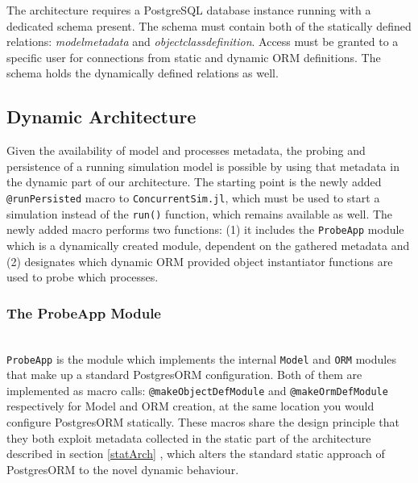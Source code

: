 \documentclass{juliacon}
\begin{document}
The architecture requires a PostgreSQL database instance running with a dedicated schema present. The schema must contain both of the statically defined relations: \textit{modelmetadata} and \textit{objectclassdefinition}. Access must be granted to a specific user for connections from static and dynamic ORM definitions. The schema holds the dynamically defined relations as well. \vskip 6pt

\subsection{Dynamic Architecture}

Given the availability of model and processes metadata, the probing and persistence of a running simulation model is possible by using that metadata in the dynamic part of our architecture. The starting point is the newly added \texttt{@runPersisted} macro to \texttt{ConcurrentSim.jl}, which must be used to start a simulation  instead of the \texttt{run()} function, which remains available as well. The newly added macro performs two functions: (1) it includes the \texttt{ProbeApp} module which is a dynamically created module, dependent on the gathered metadata and (2) designates which dynamic ORM provided object instantiator functions are used to probe which processes. \vskip 6pt

\subsubsection{The ProbeApp Module}\hfill\\

\texttt{ProbeApp} is the module which implements the internal \texttt{Model} and \texttt{ORM} modules that make up a standard PostgresORM configuration. Both of them are implemented as macro calls: \texttt{@makeObjectDefModule} and \texttt{@makeOrmDefModule} respectively for Model and ORM creation, at the same location you would configure PostgresORM statically. These macros share the design principle that they both exploit metadata collected in the static part of the architecture described in section \ref{statArch} , which alters the standard static approach of PostgresORM to the novel dynamic behaviour.\vskip 6pt

\end{document}
